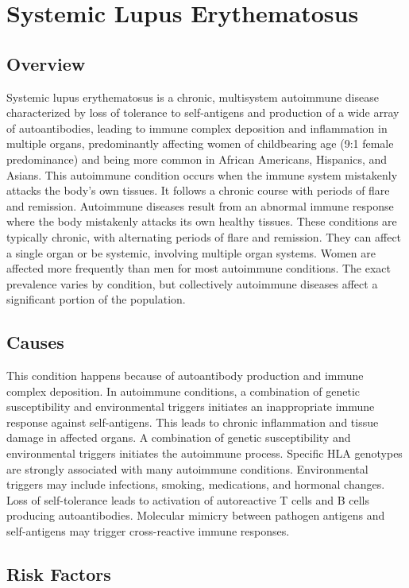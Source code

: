 \chapter{Systemic Lupus Erythematosus}
\label{sec:Systemic Lupus Erythematosus}

\section{Overview}
Systemic lupus erythematosus is a chronic, multisystem autoimmune disease characterized by loss of tolerance to self-antigens and production of a wide array of autoantibodies, leading to immune complex deposition and inflammation in multiple organs, predominantly affecting women of childbearing age (9:1 female predominance) and being more common in African Americans, Hispanics, and Asians. This autoimmune condition occurs when the immune system mistakenly attacks the body's own tissues. It follows a chronic course with periods of flare and remission. Autoimmune diseases result from an abnormal immune response where the body mistakenly attacks its own healthy tissues. These conditions are typically chronic, with alternating periods of flare and remission. They can affect a single organ or be systemic, involving multiple organ systems. Women are affected more frequently than men for most autoimmune conditions. The exact prevalence varies by condition, but collectively autoimmune diseases affect a significant portion of the population.
\section{Causes}
This condition happens because of autoantibody production and immune complex deposition. In autoimmune conditions, a combination of genetic susceptibility and environmental triggers initiates an inappropriate immune response against self-antigens. This leads to chronic inflammation and tissue damage in affected organs. A combination of genetic susceptibility and environmental triggers initiates the autoimmune process. Specific HLA genotypes are strongly associated with many autoimmune conditions. Environmental triggers may include infections, smoking, medications, and hormonal changes. Loss of self-tolerance leads to activation of autoreactive T cells and B cells producing autoantibodies. Molecular mimicry between pathogen antigens and self-antigens may trigger cross-reactive immune responses.
\section{Risk Factors}


